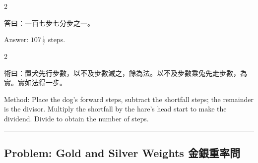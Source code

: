 \documentclass[10pt,a4paper]{article}
\newcommand{\longline}{\noindent\rule{\textwidth}{0.4pt}}
\begin{document}
\begin{paracol}{2}

\begin{leftcolumn*}
\begin{answerbi}[\textbf{答}]
答曰：一百七步七分步之一。
\end{answerbi}
\end{leftcolumn*}

\begin{rightcolumn*}
\begin{answerbi}
Answer: $107\,\frac{1}{7}$ steps.
\end{answerbi}
\end{rightcolumn*}

\end{paracol}

\begin{paracol}{2}

\begin{leftcolumn*}
\begin{methodbi}[\textbf{術}]
術曰：置犬先行步數，以不及步數減之，餘為法。以不及步數乘兔先走步數，為實。實如法得一步。
\end{methodbi}
\end{leftcolumn*}

\begin{rightcolumn*}
\begin{methodbi}
Method: Place the dog's forward steps, subtract the shortfall steps; the remainder is the divisor. Multiply the shortfall by the hare's head start to make the dividend. Divide to obtain the number of steps.
\end{methodbi}
\end{rightcolumn*}

\end{paracol}

\vspace{0.3cm}
\longline
\vspace{0.3cm}

\subsection{Problem: Gold and Silver Weights 金銀重率問}
\end{document}
